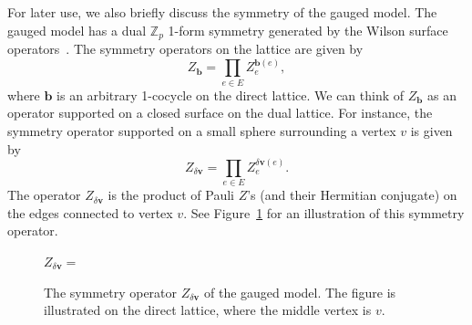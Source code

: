 \documentclass[aps,twocolumn,prx,floatfix,preprintnumbers, nofootinbib,10pt]{revtex4-2}
\numberwithin{equation}{section}
\theoremstyle{definition}
\theoremstyle{remark}
\theoremstyle{claim}
\begin{document}
For later use, we also briefly discuss the symmetry of the gauged model.
The gauged model has a dual $\mathbb{Z}_p$ 1-form symmetry generated by the Wilson surface operators~\cite{Gaiotto:2014kfa}.
The symmetry operators on the lattice are given by
\begin{equation}
Z_{\bm{b}} = \prod_{e \in E} Z_e^{\bm{b}(e)},
\end{equation}
where $\bm{b}$ is an arbitrary 1-cocycle on the direct lattice.
We can think of $Z_{\bm{b}}$ as an operator supported on a closed surface on the dual lattice.
For instance, the symmetry operator supported on a small sphere surrounding a vertex $v$ is given by
\begin{equation}
Z_{\delta \bm{v}} = \prod_{e \in E} Z_e^{\delta \bm{v}(e)}.
\end{equation}
The operator $Z_{\delta \bm{v}}$ is the product of Pauli $Z$'s (and their Hermitian conjugate) on the edges connected to vertex $v$.
See Figure~\ref{fig: Z delta v} for an illustration of this symmetry operator.
\begin{figure}
\centering
$Z_{\delta \bm{v}} =$
\caption{The symmetry operator $Z_{\delta \bm{v}}$ of the gauged model. The figure is illustrated on the direct lattice, where the middle vertex is $v$.}
\label{fig: Z delta v}
\end{figure}


\end{document}
